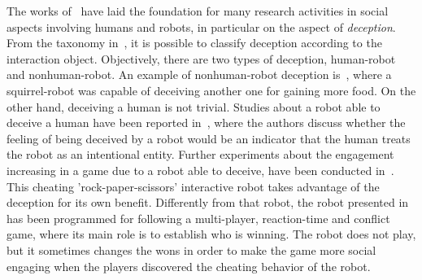 The works of~\cite{kelley_interpersonal_1978, wagner_analyzing_2008, wagner_acting_2011, wagner_robot_2009} have laid the foundation for many research activities in social aspects involving humans and robots, in particular on the aspect of \textit{deception}. From the taxonomy in~\cite{shim_taxonomy_2013}, it is possible to classify deception according to the interaction object. Objectively, there are two types of deception, human-robot and nonhuman-robot.
An example of nonhuman-robot deception is~\cite{shim_biologically-inspired_2012}, where a squirrel-robot was capable of deceiving another one for gaining more food.
On the other hand, deceiving a human is not trivial. Studies about a robot able to deceive a human have been reported in~\cite{terada_can_2010}, where the authors discuss whether the feeling of being deceived by a robot would be an indicator that the human treats the robot as an intentional entity. 
Further experiments about the engagement increasing in a game due to a robot able to deceive, have been conducted in~\cite{short_no_2010}. This cheating 'rock-paper-scissors' interactive robot takes advantage of the deception for its own benefit.
Differently from that robot, the robot presented in~\cite{vazquez_deceptive_2011} has been programmed for following a multi-player, reaction-time and conflict game, where its main role is to establish who is winning. The robot does not play, but it sometimes changes the wons in order to make the game more social engaging when the players discovered the cheating behavior of the robot. %

